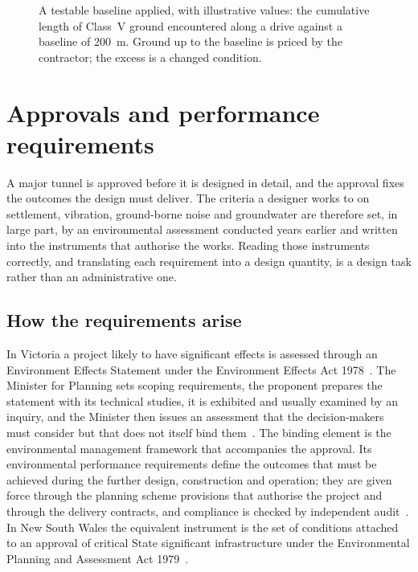 \begin{figure}[htbp]
\centering
{}
\caption{A testable baseline applied, with illustrative values: the cumulative length of Class~V ground encountered along a drive against a baseline of 200~m. Ground up to the baseline is priced by the contractor; the excess is a changed condition.}
\label{fig:baseline-mechanism}
\end{figure}

\section{Approvals and performance requirements}
\label{sec:approvals-performance}

A major tunnel is approved before it is designed in detail, and the approval
fixes the outcomes the design must deliver. The criteria a designer works to
on settlement, vibration, ground-borne noise and groundwater are therefore
set, in large part, by an environmental assessment conducted years earlier and
written into the instruments that authorise the works. Reading those
instruments correctly, and translating each requirement into a design
quantity, is a design task rather than an administrative one.

\subsection{How the requirements arise}
\label{sec:requirements-arise}

In Victoria a project likely to have significant effects is assessed through
an Environment Effects Statement under the Environment Effects Act
1978~\citep{vic1978eeact}. The Minister for Planning sets scoping
requirements, the proponent prepares the statement with its technical studies,
it is exhibited and usually examined by an inquiry, and the Minister then issues
an assessment that the decision-makers must consider but that does not itself
bind them~\citep{dtp2024ees}. The binding element is the environmental
management framework that accompanies the approval. Its environmental
performance requirements define the outcomes that must be achieved during the
further design, construction and operation; they are given force through the
planning scheme provisions that authorise the project and through the delivery
contracts, and compliance is checked by independent
audit~\citep{wda2017ees}. In New South Wales the equivalent instrument is the
set of conditions attached to an approval of critical State significant
infrastructure under the Environmental Planning and Assessment Act
1979~\citep{nsw1979epa,nsw2020m4m5coa}.

